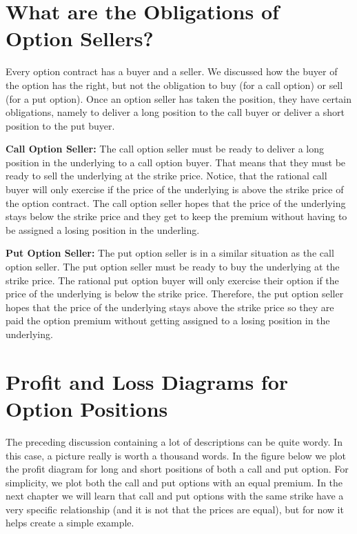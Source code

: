 \documentclass[
]{book}
\begin{document}
\hypertarget{what-are-the-obligations-of-option-sellers}{%
\section{What are the Obligations of Option Sellers?}\label{what-are-the-obligations-of-option-sellers}}

Every option contract has a buyer and a seller. We discussed how the buyer of the option has the right, but not the obligation to buy (for a call option) or sell (for a put option). Once an option seller has taken the position, they have certain obligations, namely to deliver a long position to the call buyer or deliver a short position to the put buyer.

\textbf{Call Option Seller:} The call option seller must be ready to deliver a long position in the underlying to a call option buyer. That means that they must be ready to sell the underlying at the strike price. Notice, that the rational call buyer will only exercise if the price of the underlying is above the strike price of the option contract. The call option seller hopes that the price of the underlying stays below the strike price and they get to keep the premium without having to be assigned a losing position in the underling.

\textbf{Put Option Seller:} The put option seller is in a similar situation as the call option seller. The put option seller must be ready to buy the underlying at the strike price. The rational put option buyer will only exercise their option if the price of the underlying is below the strike price. Therefore, the put option seller hopes that the price of the underlying stays above the strike price so they are paid the option premium without getting assigned to a losing position in the underlying.

\hypertarget{profit-and-loss-diagrams-for-option-positions}{%
\section{\texorpdfstring{\textbf{Profit and Loss Diagrams for Option Positions}}{Profit and Loss Diagrams for Option Positions}}\label{profit-and-loss-diagrams-for-option-positions}}

The preceding discussion containing a lot of descriptions can be quite wordy. In this case, a picture really is worth a thousand words. In the figure below we plot the profit diagram for long and short positions of both a call and put option. For simplicity, we plot both the call and put options with an equal premium. In the next chapter we will learn that call and put options with the same strike have a very specific relationship (and it is not that the prices are equal), but for now it helps create a simple example.
\end{document}
